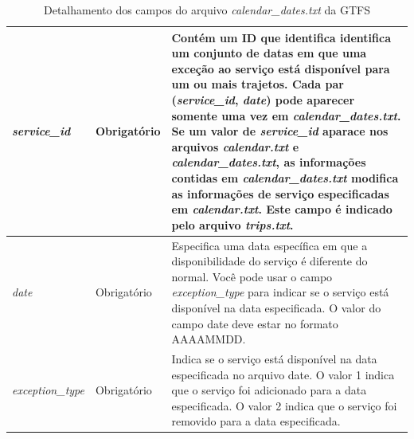\documentclass[
	12pt,				%
	oneside,			%
	a4paper,			%
	english,			%
	brazil				%
	]{abntex2ppgsi}
\begin{document}
{{\begin{apendicesenv}
\begin{table}
\caption{Detalhamento dos campos do arquivo \textit{calendar\_dates.txt} da GTFS}
      \label{tab:gtfsCalendarDates}
\begin{tabular}[!htb]{>{\centering\arraybackslash}m{3.8cm} | >{\centering}m{2.5cm} | >{\centering\arraybackslash}m{8.5cm}}
\hline
\textit{service\_id} & Obrigatório & Contém um ID que identifica identifica um conjunto de datas em que uma exceção ao serviço está disponível para um ou mais trajetos. Cada par (\textit{service\_id}, \textit{date}) pode aparecer somente uma vez em \textit{calendar\_dates.txt}. Se um valor de \textit{service\_id} aparace nos arquivos \textit{calendar.txt} e \textit{calendar\_dates.txt}, as informações contidas em \textit{calendar\_dates.txt} modifica as informações de serviço especificadas em \textit{calendar.txt}. Este campo é indicado pelo arquivo \textit{trips.txt}. \\
\hline 
\textit{date} & Obrigatório & Especifica uma data específica em que a disponibilidade do serviço é diferente do normal. Você pode usar o campo \textit{exception\_type} para indicar se o serviço está disponível na data especificada. O valor do campo date deve estar no formato AAAAMMDD. \\
\hline 
\textit{exception\_type} & Obrigatório & Indica se o serviço está disponível na data especificada no arquivo date. O valor 1 indica que o serviço foi adicionado para a data especificada. O valor 2 indica que o serviço foi removido para a data especificada. \\
\hline
\end{tabular}
\end{table}
\vspace{-\baselineskip}

\clearpage


\end{apendicesenv}}}
\end{document}
